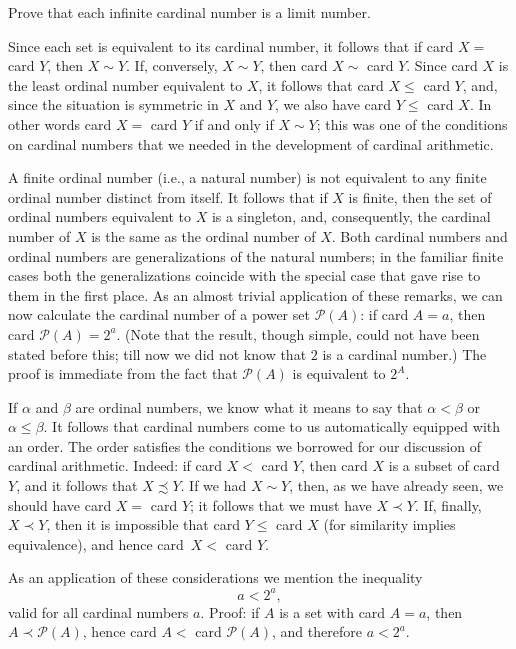 \begin{exercise} Prove that each infinite cardinal number is a limit number.
\end{exercise}

Since each set is equivalent to its cardinal number, it follows that if card $X =$ card $Y$, then $X \sim Y$. If, conversely, $X \sim Y$, then card $X \sim $ card $Y$. Since card $X$ is the least ordinal number equivalent to $X$, it follows that card $X \le $ card $Y$, and, since the situation is symmetric in $X$ and $Y$, we also have card $Y \le $ card $X$. In other words card $X =$ card $Y$ if and only if $X \sim Y$; this was one of the conditions on cardinal numbers that we needed in the development of cardinal arithmetic. 

A finite ordinal number (i.e., a natural number) is not equivalent to any finite ordinal number distinct from itself. It follows that if $X$ is finite, then the set of ordinal numbers equivalent to $X$ is a singleton, and, consequently, the cardinal number of $X$ is the same as the ordinal number of $X$. Both cardinal numbers and ordinal numbers are generalizations of the natural numbers; in the familiar finite cases both the generalizations coincide with the special case that gave rise to them in the first place. As an almost trivial application of these remarks, we can now calculate the cardinal number of a power set $\mathcal{P}(A)$: if card $A = a$, then card $\mathcal{P}(A) = 2^a$. (Note that the result, though simple, could not have been stated before this; till now we did not know that $2$ is a cardinal number.) The proof is immediate from the fact that $\mathcal{P}(A)$ is equivalent to $2^{A}$. 

If $\alpha$ and $\beta$ are ordinal numbers, we know what it means to say that $\alpha < \beta$ or $\alpha \le \beta$. It follows that cardinal numbers come to us automatically equipped with an order. The order satisfies the conditions we borrowed for our discussion of cardinal  arithmetic. Indeed: if card $X <$ card $Y$, then card $X$ is a subset of card $Y$, and it follows that $X \precsim Y$. If we had $X \sim Y$, then, as we have already seen, we should have card $X =$ card $Y$; it follows that we must have $X \prec Y$. If, finally, $X \prec Y$, then it is impossible that card $Y \le$ card $X$ (for similarity implies equivalence), and hence card~$X <$ card $Y$. 

As an application of these considerations we mention the inequality
\begin{equation*}
a < 2^{a},
\end{equation*}
valid for all cardinal numbers $a$. Proof: if $A$ is a set with card $A = a$, then $A \prec \mathcal{P}(A)$, hence card $A <$ card $\mathcal{P}(A)$, and therefore $a < 2^{a}$. 


